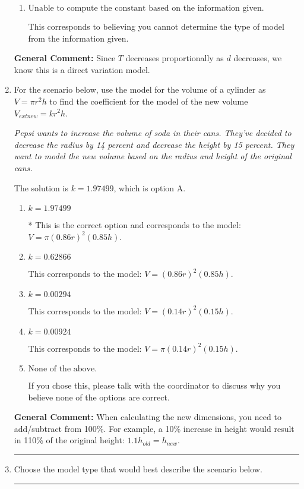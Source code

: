 \documentclass{extbook}[14pt]
\newcommand{\litem}[1]{\item #1

\rule{\textwidth}{0.4pt}}
\begin{document}
\begin{enumerate}
{\begin{enumerate}[label=\Alph*.]
This corresponds to the model $T^{4} = \frac{k}{d^{2}}$.
\item \( \text{Unable to compute the constant based on the information given.} \)

This corresponds to believing you cannot determine the type of model from the information given.
\end{enumerate}

\textbf{General Comment:} Since $T$ decreases proportionally as $d$ decreases, we know this is a direct variation model.
}
\litem{
For the scenario below, use the model for the volume of a cylinder as $V = \pi r^2 h$ to find the coefficient for the model of the new volume $V_{	ext{new}} = k r^2 h$.

\begin{center}
    \textit{ Pepsi wants to increase the volume of soda in their cans. They've decided to decrease the radius by 14 percent and decrease the height by 15 percent. They want to model the new volume based on the radius and height of the original cans. }
\end{center}


The solution is \( k = 1.97499 \), which is option A.\begin{enumerate}[label=\Alph*.]
\item \( k = 1.97499 \)

* This is the correct option and corresponds to the model: $V = \pi (0.86 r)^2 (0.85 h)$.
\item \( k = 0.62866 \)

This corresponds to the model: $V = (0.86 r)^2 (0.85 h)$.
\item \( k = 0.00294 \)

This corresponds to the model: $V = (0.14 r)^2 (0.15 h)$.
\item \( k = 0.00924 \)

This corresponds to the model: $V = \pi (0.14 r)^2 (0.15 h)$.
\item \( \text{None of the above.} \)

If you chose this, please talk with the coordinator to discuss why you believe none of the options are correct.
\end{enumerate}

\textbf{General Comment:} When calculating the new dimensions, you need to add/subtract from 100\%. For example, a 10\% increase in height would result in 110\% of the original height: $1.1h_{old} = h_{new}$.
}
\litem{
Choose the model type that would best describe the scenario below.

}
\end{enumerate}
\end{document}
